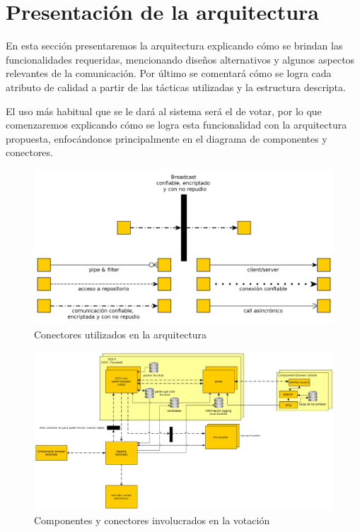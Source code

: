 \section{Presentación de la arquitectura}

En esta sección presentaremos la arquitectura explicando cómo se brindan las funcionalidades requeridas, mencionando diseños alternativos y algunos aspectos relevantes de la comunicación. Por último se comentará cómo se logra cada atributo de calidad a partir de las tácticas utilizadas y la estructura descripta. 
\\ \par


El uso más habitual que se le dará al sistema será el de votar, por lo que comenzaremos explicando cómo se logra esta funcionalidad con la arquitectura propuesta, enfocándonos principalmente en el diagrama de componentes y conectores.

\begin{figure}[H]
	\begin{center}
		\includegraphics[scale=0.22]{../diagramas/tiposConector.png}
	\end{center} 
	\caption{Conectores utilizados en la arquitectura}
	\label{fig:tiposConector}
\end{figure}

\begin{figure}[H]
	\begin{center}
		\includegraphics[scale=0.18]{../diagramas/vistaPrincipal.png}
	\end{center} 
	\caption{Componentes y conectores involucrados en la votación}	
	\label{fig:vistaPrincipal}
\end{figure}

